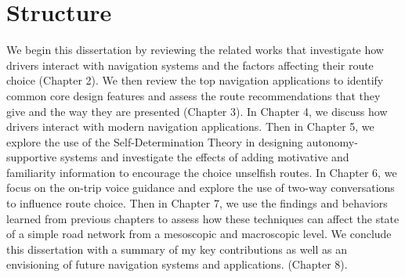 \section{Structure}
We begin this dissertation by reviewing the related works that investigate how drivers interact with navigation systems and the factors affecting their route choice (Chapter 2). We then review the top navigation applications to identify common core design features and assess the route recommendations that they give and the way they are presented (Chapter 3). In Chapter 4, we discuss how drivers interact with modern navigation applications. Then in Chapter 5, we explore the use of the Self-Determination Theory in designing autonomy-supportive systems and investigate the effects of adding motivative and familiarity information to encourage the choice unselfish routes. In Chapter 6, we focus on the on-trip voice guidance and explore the use of two-way conversations to influence route choice. Then in Chapter 7, we use the findings and behaviors learned from previous chapters to assess how these techniques can affect the state of a simple road network from a mesoscopic and macroscopic level. We conclude this dissertation with a summary of my key contributions as well as an envisioning of future navigation systems and applications. (Chapter 8).